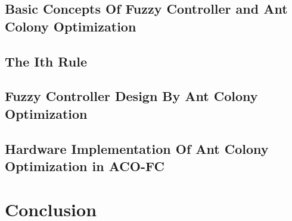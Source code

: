 \documentclass[conference]{IEEEtran}
\begin{document}
\subsection{Basic Concepts Of Fuzzy Controller and Ant Colony Optimization }
\subsection{The Ith Rule}
\subsection{Fuzzy Controller Design By Ant Colony Optimization}
\subsection{Hardware Implementation Of Ant Colony Optimization in ACO-FC}
\section{Conclusion}




\end{document}
